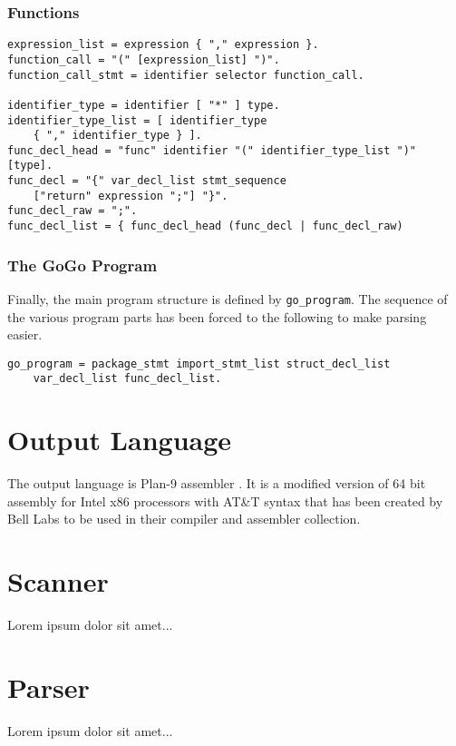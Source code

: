 \documentclass[a4paper]{report}
\begin{document}
      \subsection{Functions}

        \begin{lstlisting}[caption=Functions]
expression_list = expression { "," expression }.
function_call = "(" [expression_list] ")".
function_call_stmt = identifier selector function_call.

identifier_type = identifier [ "*" ] type.
identifier_type_list = [ identifier_type 
    { "," identifier_type } ].
func_decl_head = "func" identifier "(" identifier_type_list ")"  [type].
func_decl = "{" var_decl_list stmt_sequence 
    ["return" expression ";"] "}".
func_decl_raw = ";".
func_decl_list = { func_decl_head (func_decl | func_decl_raw) 
        \end{lstlisting}

      \subsection{The GoGo Program}
        Finally, the main program structure is defined by \texttt{go\_program}. The sequence of the various program parts has been forced to the following to make parsing easier.

        \begin{lstlisting}[caption=GoGo Program]
go_program = package_stmt import_stmt_list struct_decl_list 
    var_decl_list func_decl_list.
        \end{lstlisting}


  \chapter{Output Language}
    The output language is Plan-9 assembler \cite{pik00}. It is a modified version of 64 bit assembly for Intel x86 processors with AT\&T syntax that has been created by Bell Labs to be used in their compiler and assembler collection.

  \chapter{Scanner}
    Lorem ipsum dolor sit amet...
    
  \chapter{Parser}
    Lorem ipsum dolor sit amet...
\end{document}
